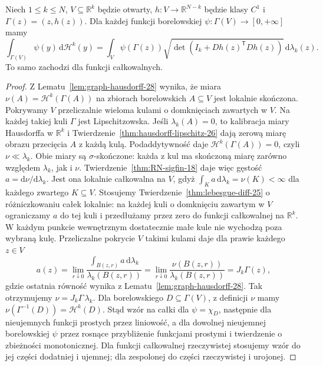 \begin{twierdzenie}
\label{thm:graph-area-28}
Niech $1\le k\le N$, $V\subseteq\mathbb R^k$ będzie otwarty,
$h:V\to\mathbb R^{N-k}$ będzie klasy $C^1$ i
$\Gamma(z)=(z,h(z))$. Dla każdej funkcji borelowskiej
$\psi:\Gamma(V)\to[0,+\infty]$ mamy
\[
 \int_{\Gamma(V)}\psi(y)\,\mathrm d\mathcal H^k(y)
 =\int_V\psi(\Gamma(z))
 \sqrt{\det(I_k+Dh(z)^{\mathsf T}Dh(z))}
 \,\mathrm d\lambda_k(z).
\]
To samo zachodzi dla funkcji całkowalnych.
\end{twierdzenie}
\begin{proof}
Z Lematu~\ref{lem:graph-hausdorff-28} wynika, że miara
$\nu(A)=\mathcal H^k(\Gamma(A))$ na zbiorach borelowskich
$A\subseteq V$ jest lokalnie skończona.
Pokrywamy $V$ przeliczalnie wieloma kulami o domknięciach
zawartych w $V$. Na każdej takiej kuli $\Gamma$ jest
Lipschitzowska. Jeśli $\lambda_k(A)=0$, to kalibracja
miary Hausdorffa w $\mathbb R^k$ i
Twierdzenie~\ref{thm:hausdorff-lipschitz-26} dają
zerową miarę obrazu przecięcia $A$ z każdą kulą.
Podaddytywność daje $\mathcal H^k(\Gamma(A))=0$,
czyli $\nu\ll\lambda_k$. Obie miary są
$\sigma$-skończone: każda z kul ma skończoną
miarę zarówno względem $\lambda_k$, jak i $\nu$.
Twierdzenie~\ref{thm:RN-sigfin-18} daje więc
gęstość $a=\mathrm d\nu/\mathrm d\lambda_k$.
Jest ona lokalnie całkowalna na $V$, gdyż
$\int_K a\,\mathrm d\lambda_k=\nu(K)<\infty$
dla każdego zwartego $K\subseteq V$.
Stosujemy Twierdzenie~\ref{thm:lebesgue-diff-25}
o różniczkowaniu całek lokalnie: na każdej kuli
o domknięciu zawartym w $V$ ograniczamy $a$ do
tej kuli i przedłużamy przez zero do funkcji
całkowalnej na $\mathbb R^k$. W każdym punkcie
wewnętrznym dostatecznie małe kule nie wychodzą
poza wybraną kulę. Przeliczalne pokrycie $V$
takimi kulami daje dla prawie każdego $z\in V$
\[
 a(z)=\lim_{r\downarrow0}
 \frac{\int_{B(z,r)}a\,\mathrm d\lambda_k}
 {\lambda_k(B(z,r))}
 =\lim_{r\downarrow0}\frac{\nu(B(z,r))}
 {\lambda_k(B(z,r))}=J_k\Gamma(z),
\]
gdzie ostatnia równość wynika z
Lematu~\ref{lem:graph-hausdorff-28}.
Tak otrzymujemy $\nu=J_k\Gamma\,\lambda_k$.
Dla borelowskiego $D\subseteq\Gamma(V)$,
z definicji $\nu$ mamy
$\nu(\Gamma^{-1}(D))=\mathcal H^k(D)$.
Stąd wzór na całki dla $\psi=\chi_D$, następnie
dla nieujemnych funkcji prostych przez liniowość,
a dla dowolnej nieujemnej borelowskiej $\psi$
przez rosnące przybliżenie funkcjami prostymi
i twierdzenie o zbieżności monotonicznej.
Dla funkcji całkowalnej rzeczywistej stosujemy
wzór do jej części dodatniej i ujemnej;
dla zespolonej do części rzeczywistej i urojonej.
\end{proof}


